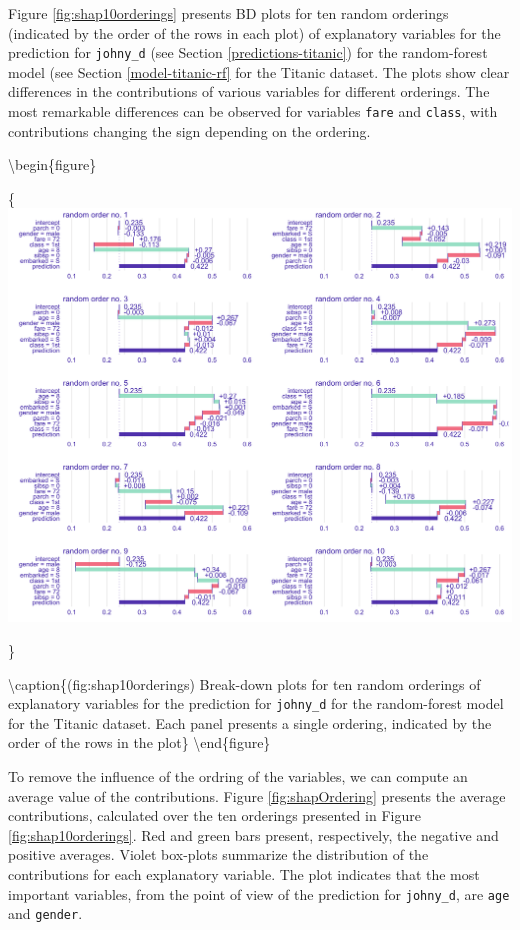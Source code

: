 \documentclass[12pt,]{krantz}
\begin{document}
Figure \ref{fig:shap10orderings} presents BD plots for ten random orderings (indicated by the order of the rows in each plot) of explanatory variables for the prediction for \texttt{johny\_d} (see Section \ref{predictions-titanic}) for the random-forest model (see Section \ref{model-titanic-rf} for the Titanic dataset. The plots show clear differences in the contributions of various variables for different orderings. The most remarkable differences can be observed for variables \texttt{fare} and \texttt{class}, with contributions changing the sign depending on the ordering.

\textbackslash{}begin\{figure\}

\{\centering \includegraphics[width=1\linewidth]{figure/shap_10_replicates}

\}

\textbackslash{}caption\{(fig:shap10orderings) Break-down plots for ten random orderings of explanatory variables for the prediction for \texttt{johny\_d} for the random-forest model for the Titanic dataset. Each panel presents a single ordering, indicated by the order of the rows in the plot\}\label{fig:shap10orderings}
\textbackslash{}end\{figure\}

To remove the influence of the ordring of the variables, we can compute an average value of the contributions.
Figure \ref{fig:shapOrdering} presents the average contributions, calculated over the ten orderings presented in Figure \ref{fig:shap10orderings}. Red and green bars present, respectively, the negative and positive averages. Violet box-plots summarize the distribution of the contributions for each explanatory variable. The plot indicates that the most important variables, from the point of view of the prediction for \texttt{johny\_d}, are \texttt{age} and \texttt{gender}.
\end{document}
